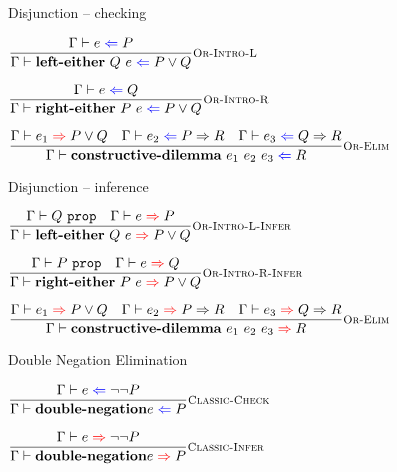 \documentclass{beamer}
\begin{document}
\begin{frame}{Disjunction -- checking}

\begin{center}
  $\infrule[Or-Intro-L]{\proofcheck{e}{P}}{\proofcheck{\orintrol[Q]{e}}{\Or{P}{Q}}}$

  \vspace{2em}

  $\infrule[Or-Intro-R]{\proofcheck{e}{Q}}{\proofcheck{\orintror[P]{e}}{\Or{P}{Q}}}$

  \vspace{2em}

  $\infrule[Or-Elim]{\proofinfer{e_1}{\Or{P}{Q}} \quad \proofcheck{e_2}{\Impl{P}{R}} \quad \proofcheck{e_3}{\Impl{Q}{R}}}{\proofcheck{\orelim{e_1}{e_2}{e_3}}{R}}$
\end{center}

\end{frame}

\begin{frame}{Disjunction -- inference}

\begin{center}
  $\infrule[Or-Intro-L-Infer]{\prop[\Gamma]{Q} \quad \proofinfer{e}{P}}{\proofinfer{\orintrol[Q]{e}}{\Or{P}{Q}}}$

  \vspace{2em}

  $\infrule[Or-Intro-R-Infer]{\prop[\Gamma]{P} \quad \proofinfer{e}{Q}}{\proofinfer{\orintror[P]{e}}{\Or{P}{Q}}}$

  \vspace{2em}

  $\infrule[Or-Elim]{\proofinfer{e_1}{\Or{P}{Q}} \quad \proofinfer{e_2}{\Impl{P}{R}} \quad \proofinfer{e_3}{\Impl{Q}{R}}}{\proofinfer{\orelim{e_1}{e_2}{e_3}}{R}}$
\end{center}

\end{frame}

\begin{frame}{Double Negation Elimination}

\begin{center}
  $\infrule[Classic-Check]{\proofcheck{e}{\Not{\Not{P}}}}{\proofcheck{\dn{e}}{P}}$

  \vspace{2em}

  $\infrule[Classic-Infer]{\proofinfer{e}{\Not{\Not{P}}}}{\proofinfer{\dn{e}}{P}}$
\end{center}

\end{frame}
\end{document}
